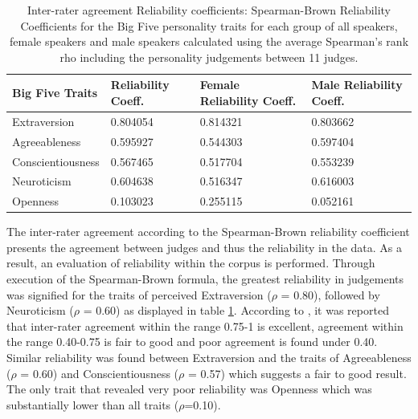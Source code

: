 \documentclass{l4proj}
\begin{document}
\begin{table}[b]
\centering
{}
\begin{tabular}{llll}
\small{\textbf{Big Five Traits}} & \small{\textbf{Reliability Coeff.}} & \small{\textbf{Female Reliability Coeff.}}  & \small{\textbf{Male Reliability Coeff.}}\\ \hline%
Extraversion        & 0.804054    & 0.814321    & 0.803662                     \\
Agreeableness       & 0.595927    & 0.544303    & 0.597404                     \\
Conscientiousness   & 0.567465    & 0.517704    & 0.553239                     \\
Neuroticism         & 0.604638    & 0.516347    & 0.616003                     \\
Openness            & 0.103023    & 0.255115    & 0.052161   
\end{tabular}
\vspace{10pt}
\caption{Inter-rater agreement Reliability coefficients: Spearman-Brown Reliability Coefficients for the Big Five personality traits for each group of all speakers, female speakers and male speakers calculated using the average Spearman's rank rho including the personality judgements between 11 judges.}
\label{table:StatAnalysis_brown}
\end{table}

The inter-rater agreement according to the Spearman-Brown reliability coefficient presents the agreement between judges and thus the reliability in the data. As a result, an evaluation of reliability within the corpus is performed.
Through execution of the Spearman-Brown formula, the greatest reliability in judgements was signified for the traits of perceived Extraversion ($\rho$ = 0.80), followed by Neuroticism ($\rho$ = 0.60) as displayed in table \ref{table:StatAnalysis_brown}.
According to \citet{fleiss1981measurement}, it was reported that inter-rater agreement within the range 0.75-1 is excellent, agreement within the range 0.40-0.75 is fair to good and poor agreement is found under 0.40. 
Similar reliability was found between Extraversion and the traits of Agreeableness ($\rho$ = 0.60) and Conscientiousness ($\rho$ = 0.57) which suggests a fair to good result.
The only trait that revealed very poor reliability was Openness which was substantially lower than all traits ($\rho$=0.10).
\end{document}

